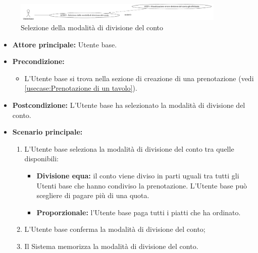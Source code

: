\label{usecase:Selezione della modalità di divisione del conto}

\begin{figure}[h]
	\centering
	\includegraphics[width=0.9\textwidth]{./uml/UCB15.png} 
	\caption{Selezione della modalità di divisione del conto}
	\label{fig:UCB14}
  \end{figure}

\begin{itemize}
	\item \textbf{Attore principale:} Utente base.
	
	\item \textbf{Precondizione:}
	\begin{itemize}
		\item L'Utente base si trova nella sezione di creazione di una prenotazione (vedi \autoref{usecase:Prenotazione di un tavolo}).
	\end{itemize}

	\item \textbf{Postcondizione:}
	      L'Utente base ha selezionato la modalità di divisione del conto.
	\item \textbf{Scenario principale:}
	      \begin{enumerate}
		      \item L'Utente base seleziona la modalità di divisione del conto
		            tra quelle disponibili:
					\begin{itemize}
						\item \textbf{Divisione equa:} il conto viene diviso in parti
							  uguali tra tutti gli Utenti base che hanno condiviso la
							  prenotazione. L'Utente base può scegliere di pagare più di
							  una quota.
		  
						\item \textbf{Proporzionale:} l'Utente base paga tutti i piatti che ha ordinato.
					\end{itemize}

		      \item L'Utente base conferma la modalità di divisione del conto;

		      \item Il Sistema memorizza la modalità di divisione del conto.
	      \end{enumerate}


\end{itemize}
